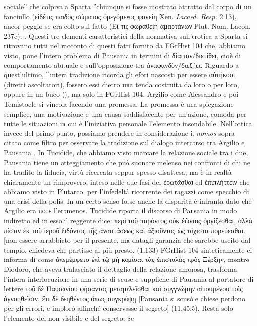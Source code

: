 {sociale'' che colpiva a Sparta ''chiunque si fosse mostrato attratto dal corpo di un fanciullo (\textgreek{εἰδέτις παιδὸς σώματος ὀρεγόμενος φανείη} Xen. \emph{Lacaed. Resp.} 2.13), ancor peggio se era colto sul fatto (\textgreek{Εἴ τις φωραθείη ἁμαρτάνων} Plut. Nom. Lacon. 237c). \cite[103 e 223-224]{Vattuone2004a}. Questi tre elementi caratteristici della normativa sull'erotica a Sparta si ritrovano tutti nel racconto di questi fatti fornito da FGrHist 104 che, abbiamo visto, pone l'intero problema di Pausania  in termini di \textgreek{δίαιταν/διετίθει}, cioè di comportamento abituale e sull'opposizione tra \textgreek{ἀναφανδὸν/διεξῄει}. Riguardo a quest'ultimo, l'intera tradizione ricorda gli efori nascosti per essere \textgreek{αὐτήκοοι} (diretti ascoltatori), fossero essi dietro una tenda costruita da loro o per loro, oppure in un buco (\cite[124]{Ogden2002}), ma solo in FGrHist 104, Argilio  come Alessandro e poi Temistocle si vincola facendo una promessa. La promessa è una spiegazione semplice, una motivazione e una causa soddisfacente per un'azione, comoda per tutte le situazioni in cui è l'iniziativa personale l'elemento insondabile. Nell'ottica invece del primo punto, possiamo prendere in considerazione il \emph{nomos} sopra citato come filtro per osservare la tradizione sul dialogo intercorso tra Argilio  e Pausania \label{ref:dialogoargiliopausania}. In Tucidide, che abbiamo visto marcare la relazione sociale tra i due, Pausania  tiene un atteggiamento che può suonare melenso nei confronti di chi ne ha tradito la fiducia, virtù ricercata seppur spesso disattesa, ma è in realtà chiaramente un rimprovero, inteso nelle due fasi del \textgreek{ἐρωτᾶσθαι} ed \textgreek{ἐπιπλήττειν} che abbiamo visto in Plutarco. \cite[130]{Vattuone2004a} per l'infedeltà ricorrente dei ragazzi come specchio di una crisi della polis. In un certo senso forse anche la disparità è infranta dato che Argilio  era \textgreek{ποτε} l'eromenos. Tucidide riporta il discorso di Pausania  in modo indiretto ed in esso il reggente dice: \textgreek{περὶ τοῦ παρόντος οὐκ  ἐῶντος ὀργίζεσθαι, ἀλλὰ πίστιν ἐκ τοῦ ἱεροῦ διδόντος τῆς ἀναστάσεως καὶ ἀξιοῦντος ὡς τάχιστα πορεύεσθαι.} [non essere arrabbiato per il presente, ma datagli garanzia che  sarebbe uscito dal tempio, chiedeva che partisse al più presto. (1.133) FGrHist 104 sinteticamente ci informa di come \textgreek{ἀπεμέμφετο ἐπὶ τῷ μὴ κομίσαι τὰς ἐπιστολὰς πρὸς Ξέρξην}, mentre Diodoro, che aveva tralasciato il dettaglio della relazione amorosa, trasforma l'intera interlocuzione in una serie di scuse e suppliche di Pausania  al portatore di lettere \textgreek{τοῦ δὲ Παυσανίου φήσαντος μεταμελεῖσθαι καὶ συγγνώμην αἰτουμένου τοῖς ἀγνοηθεῖσιν, ἔτι δὲ δεηθέντος ὅπως συγκρύψῃ }[Pausania si scusò e chiese perdono per gli errori, e implorò affinché conservasse il segreto] (11.45.5). Resta solo l'elemento del non visibile e del segreto. Se }
